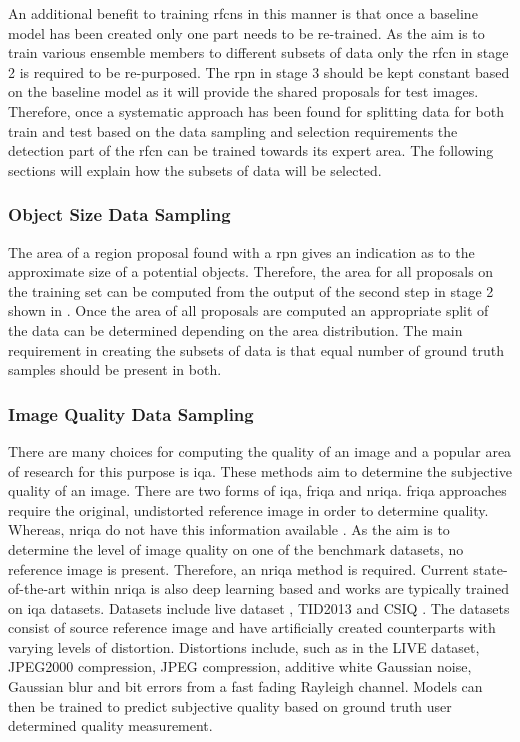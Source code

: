 \documentclass[a4paper,twoside]{article}
\begin{document}
An additional benefit to training \glspl{rfcn} in this manner is that once a baseline model has been created only one part needs to be re-trained. As the aim is to train various ensemble members to different subsets of data only the \gls{rfcn} in stage 2 is required to be re-purposed. The \gls{rpn} in stage 3 should be kept constant based on the baseline model as it will provide the shared proposals for test images. Therefore, once a systematic approach has been found for splitting data for both train and test based on the data sampling and selection requirements the detection part of the \gls{rfcn} can be trained towards its expert area. The following sections will explain how the subsets of data will be selected.

\subsubsection{Object Size Data Sampling}
The area of a region proposal found with a \gls{rpn} gives an indication as to the approximate size of a potential objects. Therefore, the area for all proposals on the training set can be computed from the output of the second step in stage 2 shown in . Once the area of all proposals are computed an appropriate split of the data can be determined depending on the area distribution. The main requirement in creating the subsets of data is that equal number of ground truth samples should be present in both.

\subsubsection{Image Quality Data Sampling}
There are many choices for computing the quality of an image and a popular area of research for this purpose is \gls{iqa}. These methods aim to determine the subjective quality of an image. There are two forms of \gls{iqa}, \gls{friqa} and \gls{nriqa}. \gls{friqa} approaches require the original, undistorted reference image in order to determine quality. Whereas, \gls{nriqa} do not have this information available \cite{deepiqa}. As the aim is to determine the level of image quality on one of the benchmark datasets, no reference image is present. Therefore, an \gls{nriqa} method is required. Current state-of-the-art within \gls{nriqa} is also deep learning based and works are typically trained on \gls{iqa} datasets. Datasets include \gls{live} dataset \cite{livepaper} \cite{liveweb}, TID2013 \cite{tid2013} and CSIQ \cite{csiq}. The datasets consist of source reference image and have artificially created counterparts with varying levels of distortion. Distortions include, such as in the LIVE dataset, JPEG2000 compression, JPEG compression, additive white Gaussian noise, Gaussian blur and bit errors from a fast fading Rayleigh channel. Models can then be trained to predict subjective quality based on ground truth user determined quality measurement.
\end{document}
